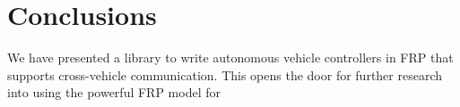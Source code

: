\section{Conclusions}

We have presented a library to write autonomous vehicle controllers in FRP that supports cross-vehicle communication.
This opens the door for further research into using the powerful FRP model for  


